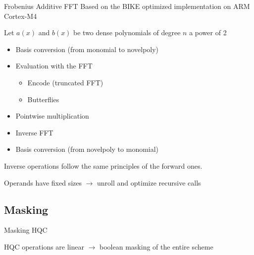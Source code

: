 \begin{frame}{Frobenius Additive FFT}
    Based on the BIKE optimized implementation on ARM Cortex-M4~\cite{DBLP:journals/tches/ChenCK21}\\
    \begin{block}{}
        Let $a(x)$ and $b(x)$ be two dense polynomials of degree $n$ a power of 2
        \begin{itemize}
           \item Basis conversion (from monomial to novelpoly)
           \item Evaluation with the FFT
           \begin{itemize}
                \item Encode (truncated FFT)
                \item Butterflies
           \end{itemize}
           \item Pointwise multiplication
           \item Inverse FFT
           \item Basis conversion (from novelpoly to monomial)
        \end{itemize}
        Inverse operations follow the same principles of the forward ones.
    \end{block}
    Operands have fixed sizes $\rightarrow$ unroll and optimize recursive calls
\end{frame}

\subsection{Masking}

\begin{frame}{Masking HQC}
    \begin{block}{}
    HQC operations are linear $\rightarrow$ boolean masking of the entire scheme
    \end{block}
\end{frame}

